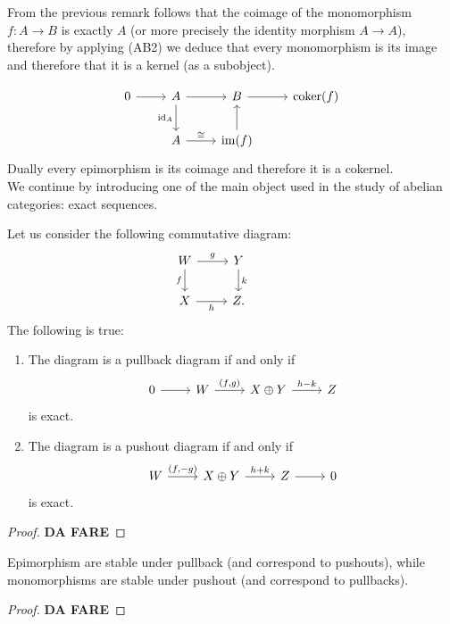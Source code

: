 From the previous remark follows that the coimage of the monomorphism $f: A \longrightarrow B $ is exactly $A$ (or more precisely the identity morphism $A \longrightarrow A$), therefore by applying (AB2) we deduce that every monomorphism is its image and therefore that it is a kernel (as a subobject).

\[\begin{tikzcd}
	0 & A & B & {\coker(f)} \\
	& A & {\im(f)}
	\arrow[from=1-1, to=1-2]
	\arrow[from=1-2, to=1-3]
	\arrow["{\id_A}"', from=1-2, to=2-2]
	\arrow[from=1-3, to=1-4]
	\arrow["\cong", from=2-2, to=2-3]
	\arrow[from=2-3, to=1-3]
\end{tikzcd}\]
Dually every epimorphism is its coimage and therefore it is a cokernel. \\
We continue by introducing one of the main object used in the study of abelian categories: exact sequences.


\begin{lemma}
	Let us consider the following commutative diagram:
	\[\begin{tikzcd}
		W & Y & {} \\
		X & {Z.}
		\arrow["g", from=1-1, to=1-2]
		\arrow["f"', from=1-1, to=2-1]
		\arrow["k", from=1-2, to=2-2]
		\arrow["h"', from=2-1, to=2-2]
	\end{tikzcd}\]
	The following is true:
	\begin{enumerate}
		\item The diagram is a pullback diagram if and only if
		\[\begin{tikzcd}
			0 & W & {X\oplus Y} & Z
			\arrow[from=1-1, to=1-2]
			\arrow["{(f,g)}", from=1-2, to=1-3]
			\arrow["{h-k}", from=1-3, to=1-4]
		\end{tikzcd}\]
		is exact.
		\item The diagram is a pushout diagram if and only if
		\[\begin{tikzcd}
			W & {X\oplus Y} & Z & 0
			\arrow["{(f,-g)}", from=1-1, to=1-2]
			\arrow["{h+k}", from=1-2, to=1-3]
			\arrow[from=1-3, to=1-4]
		\end{tikzcd}\]
		is exact.
	\end{enumerate}
\end{lemma}

\begin{proof}
	\textbf{DA FARE}
\end{proof}

\begin{proposition}
	\label{prop:epi-pull}
	Epimorphism are stable under pullback (and correspond to pushouts), while monomorphisms are stable under pushout (and correspond to pullbacks).
\end{proposition}
\begin{proof}
	\textbf{DA FARE}
\end{proof}



